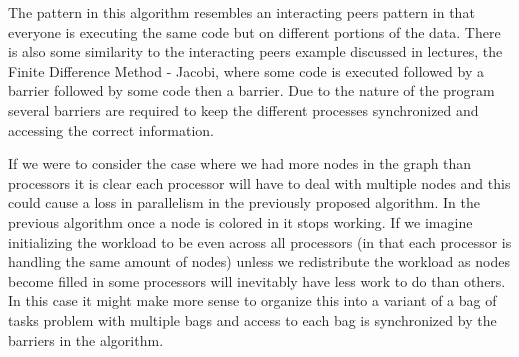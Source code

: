 \documentclass[10pt]{report}
\begin{document}
The pattern in this algorithm resembles an interacting peers pattern
in that everyone is executing the same code but on different portions
of the data. There is also some similarity to the interacting peers
example discussed in lectures, the Finite Difference
Method - Jacobi, where some code is
executed followed by a barrier followed by some code then a
barrier. Due to the nature of the program several barriers are
required to keep the different processes synchronized and accessing
the correct information.

If we were to consider the case where we had
more nodes in the graph than processors it is clear each processor
will have to deal with multiple nodes and this could cause a loss in
parallelism in the previously proposed algorithm. In the previous
algorithm once a node is colored in it stops working. If we imagine
initializing the workload to be even across all processors (in that
each processor is handling the same amount of nodes) unless we
redistribute the workload as nodes become filled in some processors
will inevitably have less work to do than others. In this case it
might make more sense to organize this into a variant of a bag of
tasks problem with multiple
bags and access to each bag is synchronized by the barriers in the
algorithm.  
\end{document}
